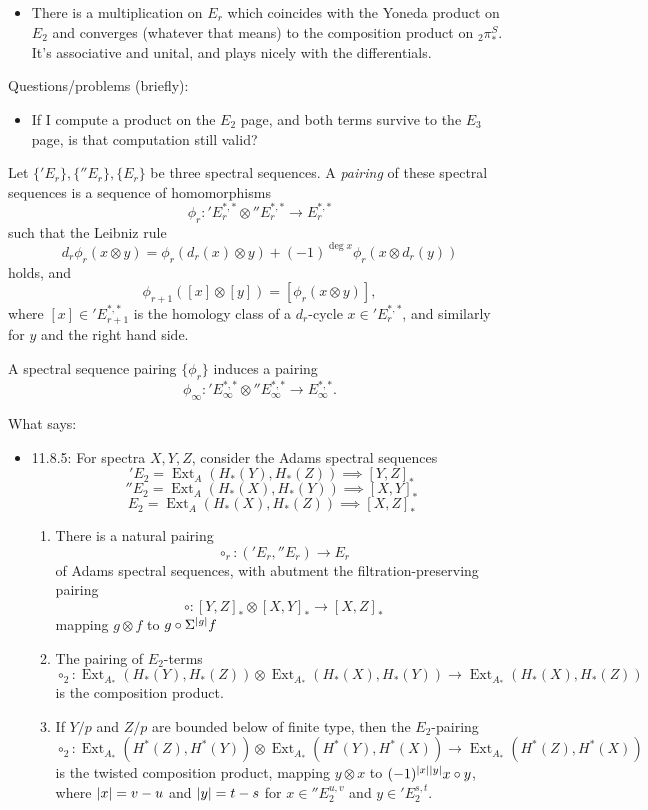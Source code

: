 \documentclass{MetricNotes2023}
\DeclareMathOperator{\Ext}{Ext}
\begin{document}
\begin{itemize}
\item There is a multiplication on \(E_r\) which coincides with the Yoneda product on \(E_2\) and converges (whatever that means) to the composition product on \(\text{}_2\pi_*^S\). It's associative and unital, and plays nicely with the differentials. 
\end{itemize}

Questions/problems (briefly):
\begin{itemize}
\item If I compute a product on the \(E_2\) page, and both terms survive to the \(E_3\) page, is that computation still valid?
\end{itemize}

\begin{definition}
Let \(\{'E_r\}, \{''E_r\}, \{E_r\}\) be three spectral sequences. A \textit{pairing} of these spectral sequences is a sequence of homomorphisms 
\[\phi_r : \text{}'E_r^{*,*}\otimes \text{}''E_r^{*,*} \to E_r^{*,*}\]
such that the Leibniz rule
\[d_r\phi_r(x\otimes y)=\phi_r(d_r(x)\otimes y)+(-1)^{\deg x}\phi_r(x\otimes d_r(y))\]
holds, and
\[\phi_{r+1}([x]\otimes[y])=[\phi_r(x\otimes y)],\]
where \([x]\in \text{}'E_{r+1}^{*,*}\) is the homology class of a \(d_r\)-cycle \(x\in \text{}'E_r^{*,*}\), and similarly for \(y\) and the right hand side. 
\end{definition}

A spectral sequence pairing \(\{\phi_r\}\) induces a pairing 
\[\phi_\infty : \text{}'E_\infty^{*,*}\otimes \text{}''E^{*,*}_\infty \to E^{*,*}_\infty.\]

What \autocite{rognes2} says:
\begin{itemize}
\item 11.8.5: For spectra \(X, Y, Z\), consider the Adams spectral sequences
\['E_2 = \Ext_A(H_*(Y), H_*(Z))\implies [Y,Z]_*\]
\[''E_2 = \Ext_A(H_*(X), H_*(Y))\implies [X,Y]_*\]
\[E_2 = \Ext_A(H_*(X), H_*(Z))\implies [X,Z]_*\] \begin{enumerate}
\item There is a natural pairing 
\[\circ_r : ('E_r, ''E_r)\to E_r\]
of Adams spectral sequences, with abutment the filtration-preserving pairing
\[\circ : [Y, Z]_* \otimes [X,Y]_* \to [X,Z]_*\]
mapping \(g \otimes f\) to \(g \circ \Sigma^{\lvert g\rvert}f\)

\item The pairing of \(E_2\)-terms 
\[\circ_2 : \Ext_{A_*}(H_*(Y), H_*(Z))\otimes \Ext_{A_*}(H_*(X), H_*(Y))\to \Ext_{A_*}(H_*(X), H_*(Z))\]
is the composition product.

\item If \(Y/p\) and \(Z/p\) are bounded below of finite type, then the \(E_2\)-pairing 
\[\circ_2 : \Ext_{A_*}(H^*(Z), H^*(Y))\otimes \Ext_{A_*}(H^*(Y), H^*(X))\to \Ext_{A_*}(H^*(Z), H^*(X))\]
is the twisted composition product, mapping \(y\otimes x\) to \((-1)^{\lvert x\rvert\lvert y\rvert}x\circ y\), where \(\lvert x\rvert=v-u\) and \(\lvert y\rvert=t-s\) for \(x\in \text{}''E_2^{u,v}\) and \(y \in \text{}'E^{s,t}_2\).
\end{enumerate}
\end{itemize}
\end{document}
